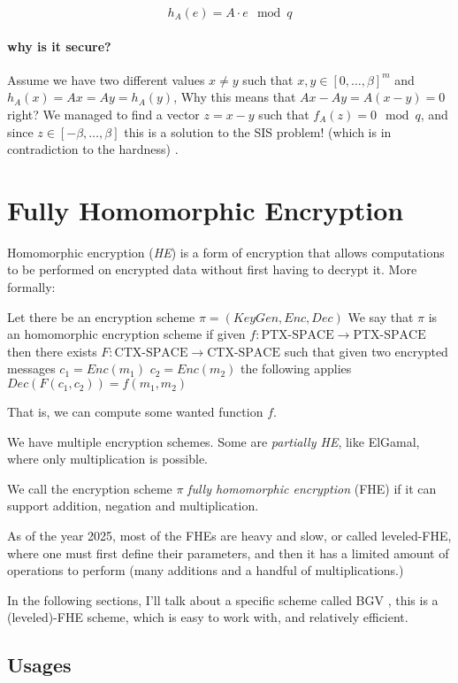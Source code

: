 $$ h_A(e) = A\cdot e \mod q$$

\paragraph{\bf why is it secure?}
Assume we have two different values $x\neq y$ such that $x,y\in [0,\dots,\beta]^m$ and $h_A(x)=Ax=Ay=h_A(y)$, 
Why this means that $Ax-Ay=A(x-y)=0$ right? We managed to find a vector $z=x-y$ such that $f_A(z)=0 \mod q$, and since $z\in[-\beta,\dots,\beta]$ this is a solution to the SIS problem! (which is in contradiction to the hardness) .


%
%
%
%
\section{Fully Homomorphic Encryption}
Homomorphic encryption (\emph{HE}) is a form of encryption that allows 
computations to be performed on encrypted data without first having to decrypt it.
More formally:
\begin{definition}[HE]
 Let there be an encryption scheme $\pi = (KeyGen,Enc, Dec)$
 We say that $\pi$ is an homomorphic encryption scheme if
 given $f:\text{PTX-SPACE}\to \text{PTX-SPACE}$ then there
 exists $F:\text{CTX-SPACE} \to \text{CTX-SPACE}$ such that
 given two encrypted messages $c_1=Enc(m_1)$ $c_2=Enc(m_2)$ the following
 applies
   $Dec(F(c_1,c_2))=f(m_1,m_2)$
\end{definition}

That is, we can compute some wanted function $f$.

We have multiple encryption schemes. Some are \emph{partially HE},
like ElGamal, where only multiplication is possible.
\begin{theorem}
 We call the encryption scheme $\pi$ \emph{fully homomorphic encryption} (FHE) if it 
 can support addition, negation and multiplication.
\end{theorem}

As of the year 2025, most of the FHEs are heavy and slow,
or called leveled-FHE, where one must first define their parameters, 
and then it has a limited amount of operations to perform (many additions and a 
handful of multiplications.)

In the following sections, I'll talk about a specific scheme called BGV \cite{BGV},
this is a (leveled)-FHE scheme, which is easy to work with, and relatively efficient.

\subsection{Usages}

